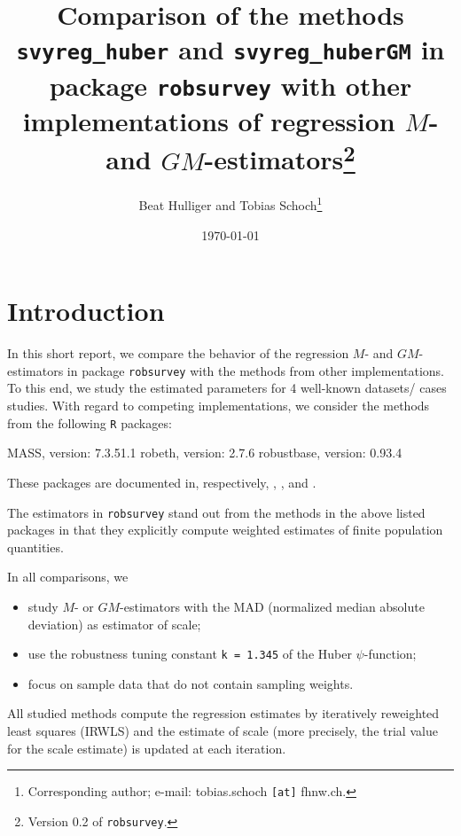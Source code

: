 \documentclass[a4paper]{scrartcl}
\begin{document}
\title{Comparison of the methods \texttt{svyreg\_huber} and \texttt{svyreg\_huberGM} in package \texttt{robsurvey} with other implementations of regression $M$- and $GM$-estimators\footnote{Version 0.2 of \texttt{robsurvey}.}} 

\author{Beat Hulliger and Tobias Schoch\footnote{Corresponding author; e-mail: tobias.schoch \texttt{[at]} fhnw.ch.}\\
  }

\date{\small\today}
\maketitle



\section{Introduction}\label{sec:intro}
In this short report, we compare the behavior of the regression $M$- and $GM$-estimators in package \texttt{robsurvey} with the methods from other implementations. To this end, we study the estimated parameters for 4 well-known datasets/ cases studies. With regard to competing implementations, we consider the methods from the following \texttt{R} packages: 
\begin{Schunk}
\begin{Soutput}
MASS, version: 7.3.51.1
robeth, version: 2.7.6
robustbase, version: 0.93.4
\end{Soutput}
\end{Schunk}
\noindent These packages are documented in, respectively, \cite{mass}, \cite{robeth}, and \cite{robustbase}. 

The estimators in \texttt{robsurvey} stand out from the methods in the above listed packages in that they explicitly compute weighted estimates of finite population quantities.   

In all comparisons, we 
\begin{itemize}
   \item study $M$- or $GM$-estimators with the MAD (normalized median absolute deviation) as estimator of scale;
   \item use the robustness tuning constant \texttt{k = 1.345} of the Huber $\psi$-function;
   \item focus on sample data that do not contain sampling weights. 
\end{itemize}
\noindent All studied methods compute the regression estimates by iteratively reweighted least squares (IRWLS) and the estimate of scale (more precisely, the trial value for the scale estimate) is updated at each iteration. 
\end{document}
